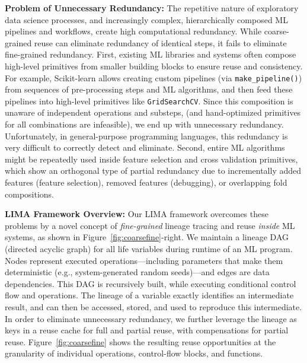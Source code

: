 \textbf{Problem of Unnecessary Redundancy:} The repetitive nature of exploratory data science processes, and increasingly complex, hierarchically composed ML pipelines and workflows, create high computational redundancy. While coarse-grained reuse can eliminate redundancy of identical steps, it fails to eliminate fine-grained redundancy. First, existing ML libraries and systems often compose high-level primitives from smaller building blocks to ensure reuse and consistency. For example, Scikit-learn \cite{PedregosaVGMTGBPWDVPCBPD11} allows creating custom pipelines (via \texttt{make\_pipeline()}) from sequences of pre-processing steps and ML algorithms, and then feed these pipelines into high-level primitives like \texttt{GridSearchCV}. Since this composition is unaware of independent operations and substeps, (and hand-optimized primitives for all combinations are infeasible), we end up with unnecessary redundancy. Unfortunately, in general-purpose programming languages, this redundancy is very difficult to correctly detect and eliminate. Second, entire ML algorithms might be repeatedly used inside feature selection and cross validation primitives, which show an orthogonal type of partial redundancy due to incrementally added features (feature selection), removed features (debugging), or overlapping fold compositions.  

\textbf{LIMA Framework Overview:} Our LIMA framework overcomes these problems by a novel concept of \emph{fine-grained} lineage tracing and reuse \emph{inside} ML systems, as shown in Figure~\ref{fig:coarsefine}-right. We maintain a lineage DAG (directed acyclic graph) for all life variables during runtime of an ML program. Nodes represent executed operations---including parameters that make them deterministic (e.g., system-generated random seeds)---and edges are data dependencies. This DAG is recursively built, while executing conditional control flow and operations. The lineage of a variable exactly identifies an intermediate result, and can then be accessed, stored, and used to reproduce this intermediate. In order to eliminate unnecessary redundancy, we further leverage the lineage as keys in a reuse cache for full and partial reuse, with compensations for partial reuse. Figure~\ref{fig:coarsefine} shows the resulting reuse opportunities at the granularity of individual operations, control-flow blocks, and functions.

